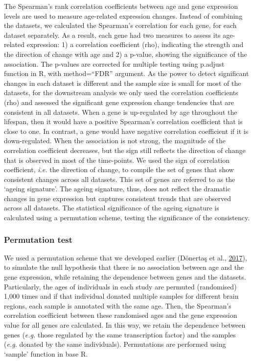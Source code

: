 \documentclass[12pt,twoside]{unicam}
\begin{document}
The Spearman's rank correlation coefficients between age and gene expression levels are used to measure age-related expression changes. Instead of combining the datasets, we calculated the Spearman's correlation for each gene, for each dataset separately. As a result, each gene had two measures to assess its age-related expression: 1) a correlation coefficient (rho), indicating the strength and the direction of change with age and 2) a p-value, showing the significance of the association. The p-values are corrected for multiple testing using p.adjust function in R, with method=``FDR'' argument. As the power to detect significant changes in each dataset is different and the sample size is small for most of the datasets, for the downstream analysis we only used the correlation coefficients (rho) and assessed the significant gene expression change tendencies that are consistent in all datasets. When a gene is up-regulated by age throughout the lifespan, then it would have a positive Spearman's correlation coefficient that is close to one. In contrast, a gene would have negative correlation coefficient if it is down-regulated. When the association is not strong, the magnitude of the correlation coefficient decreases, but the sign still reflects the direction of change that is observed in most of the time-points. We used the sign of correlation coefficient, \emph{i.e.} the direction of change, to compile the set of genes that show consistent changes across all datasets. This set of genes are referred to as the `ageing signature'. The ageing signature, thus, does not reflect the dramatic changes in gene expression but captures consistent trends that are observed across all datasets. The statistical significance of the ageing signature is calculated using a permutation scheme, testing the significance of the consistency.

\hypertarget{drugPermutationTest}{%
\subsubsection{Permutation test}\label{drugPermutationTest}}

We used a permutation scheme that we developed earlier (Dönertaş et al., \protect\hyperlink{ref-Donertas2017}{2017}), to simulate the null hypothesis that there is no association between age and the gene expression, while retaining the dependence between genes and the datasets. Particularly, the ages of individuals in each study are permuted (randomised) 1,000 times and if that individual donated multiple samples for different brain regions, each sample is annotated with the same age. Then, the Spearman's correlation coefficient between these randomised ages and the gene expression value for all genes are calculated. In this way, we retain the dependence between genes (\emph{e.g.} those regulated by the same transcription factor) and the samples (\emph{e.g.} donated by the same individuals). Permutations are performed using `sample' function in base R.
\end{document}
